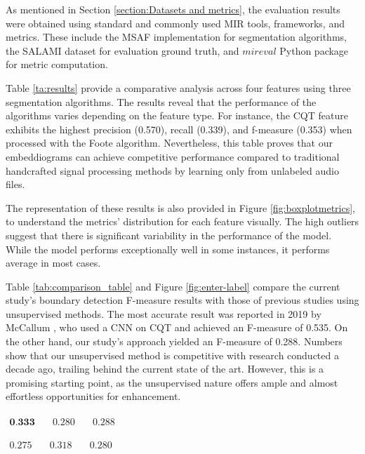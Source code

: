 
As mentioned in Section \ref{section:Datasets and metrics}, the evaluation results were obtained using standard and commonly used MIR tools, frameworks, and metrics. These include the MSAF \cite{MSAF} implementation for segmentation algorithms, the SALAMI dataset \cite{Smith2011DESIGNANNOTATIONS} for evaluation ground truth, and $mireval$ Python package \cite{RaffelMir_eval:METRICS} for metric computation.

Table \ref{ta:results} provide a comparative analysis across four features using three segmentation algorithms. The results reveal that the performance of the algorithms varies depending on the feature type. For instance, the CQT feature exhibits the highest precision (0.570), recall (0.339), and f-measure (0.353) when processed with the Foote algorithm. Nevertheless, this table proves that our embeddiograms can achieve competitive performance compared to traditional handcrafted signal processing methods by learning only from unlabeled audio files.

The representation of these results is also provided in Figure \ref{fig:boxplotmetrics}, to understand the metrics' distribution for each feature visually. The high outliers suggest that there is significant variability in the performance of the model. While the model performs exceptionally well in some instances, it performs average in most cases.

Table \ref{tab:comparison_table} and Figure \ref{fig:enter-label} compare the current study's boundary detection F-measure results with those of previous studies using unsupervised methods. The most accurate result was reported in 2019 by McCallum \cite{deepfeaturesegment}, who used a CNN on CQT and achieved an F-measure of 0.535. On the other hand, our study's approach yielded an F-measure of 0.288. Numbers show that our unsupervised method is competitive with research conducted a decade ago, trailing behind the current state of the art. However, this is a promising starting point, as the unsupervised nature offers ample and almost effortless opportunities for enhancement.


\newsavebox\embeddiobSF
\begin{lrbox}{\embeddiobSF}
   $\begin{aligned}
     \textbf{0.333} & \quad 0.280 & \quad 0.288
    \end{aligned} $
\end{lrbox}

\newsavebox\embeddiobFoote
\begin{lrbox}{\embeddiobFoote}
   $\begin{aligned}
     0.275 & \quad 0.318 & \quad 0.280
    \end{aligned} $
\end{lrbox}

